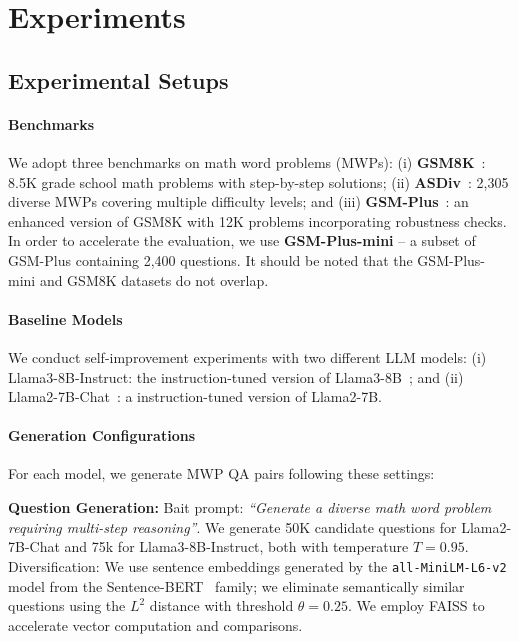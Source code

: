 \section{Experiments}\label{sec:experiments}


\subsection{Experimental Setups}

\paragraph{Benchmarks}
We adopt three benchmarks on math word problems (MWPs): (i) \textbf{GSM8K}~\citep{cobbe2021gsm8k}: 8.5K grade school math problems with step-by-step solutions;  
(ii) \textbf{ASDiv}~\citep{DBLP:conf/acl/MiaoLS20}: 2,305 diverse MWPs covering multiple difficulty levels; and (iii) \textbf{GSM-Plus}~\citep{DBLP:conf/acl/LiCZKB24}: an enhanced version of GSM8K with 12K problems incorporating robustness checks. In order to accelerate the evaluation, we use \textbf{GSM-Plus-mini} -- a subset of GSM-Plus containing 2,400 questions. It should be noted that the GSM-Plus-mini and GSM8K datasets do not overlap.

\paragraph{Baseline Models} We conduct self-improvement experiments with two different LLM models:
(i) Llama3-8B-Instruct: the instruction-tuned version of Llama3-8B~\citep{DBLP:journals/corr/abs-2407-21783}; and
(ii) Llama2-7B-Chat~\citep{DBLP:journals/corr/abs-2307-09288}: a instruction-tuned version of Llama2-7B. 

\paragraph{Generation Configurations} 
For each model, we generate MWP QA pairs following these settings:  

\textbf{Question Generation:} Bait prompt: \emph{\enquote{Generate a diverse math word problem requiring multi-step reasoning}}. We generate 50K candidate questions for Llama2-7B-Chat and 75k for Llama3-8B-Instruct, both with temperature $T=0.95$. Diversification: We use sentence embeddings generated by the \texttt{all-MiniLM-L6-v2} model from the Sentence-BERT~\citep{DBLP:conf/emnlp/ReimersG19} family; we eliminate semantically similar questions using the $L^2$ distance with threshold $\theta=0.25$. We employ 
FAISS \citep{douze2024faiss} to accelerate vector computation and comparisons.

